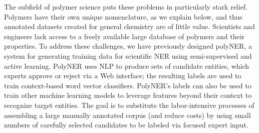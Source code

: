 The subfield of polymer science puts these problems in particularly stark relief.
Polymers have their own unique nomenclature, as we explain below, and thus annotated datasets created for general
chemistry are of little value.
Scientists and engineers lack access to a freely available large database of polymers and their properties.
To address these challenges, we have previously designed polyNER, a system for generating training data for scientific NER using semi-supervised and active learning.
PolyNER uses NLP to produce sets of candidate entities, which
experts 
approve or reject via a 
Web interface;
the resulting labels are used to train context-based word vector classifiers. %
PolyNER's labels can also be used to train other machine learning models to leverage features beyond their context to recognize target entities.
The goal is
to substitute the labor-intensive processes of assembling a large
manually annotated corpus (and reduce costs) by using small numbers of carefully selected candidates to be labeled via focused expert input. 

